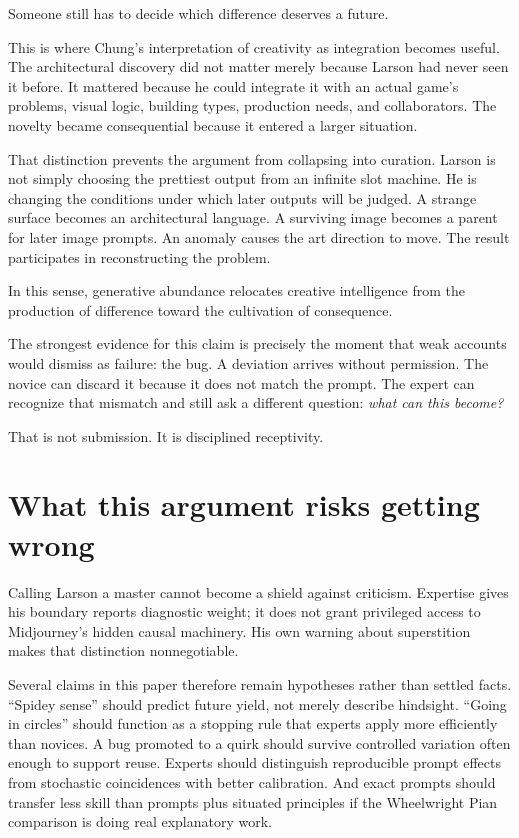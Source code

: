 \documentclass[11pt]{article}
\begin{document}
Someone still has to decide which difference deserves a future.

This is where Chung's interpretation of creativity as integration becomes useful. The architectural discovery did not matter merely because Larson had never seen it before. It mattered because he could integrate it with an actual game's problems, visual logic, building types, production needs, and collaborators. The novelty became consequential because it entered a larger situation.

That distinction prevents the argument from collapsing into curation. Larson is not simply choosing the prettiest output from an infinite slot machine. He is changing the conditions under which later outputs will be judged. A strange surface becomes an architectural language. A surviving image becomes a parent for later image prompts. An anomaly causes the art direction to move. The result participates in reconstructing the problem.

In this sense, generative abundance relocates creative intelligence from the production of difference toward the cultivation of consequence.

The strongest evidence for this claim is precisely the moment that weak accounts would dismiss as failure: the bug. A deviation arrives without permission. The novice can discard it because it does not match the prompt. The expert can recognize that mismatch and still ask a different question: \emph{what can this become?}

That is not submission. It is disciplined receptivity.

\section{What this argument risks getting wrong}
Calling Larson a master cannot become a shield against criticism. Expertise gives his boundary reports diagnostic weight; it does not grant privileged access to Midjourney's hidden causal machinery. His own warning about superstition makes that distinction nonnegotiable.

Several claims in this paper therefore remain hypotheses rather than settled facts. ``Spidey sense'' should predict future yield, not merely describe hindsight. ``Going in circles'' should function as a stopping rule that experts apply more efficiently than novices. A bug promoted to a quirk should survive controlled variation often enough to support reuse. Experts should distinguish reproducible prompt effects from stochastic coincidences with better calibration. And exact prompts should transfer less skill than prompts plus situated principles if the Wheelwright Pian comparison is doing real explanatory work.
\end{document}
